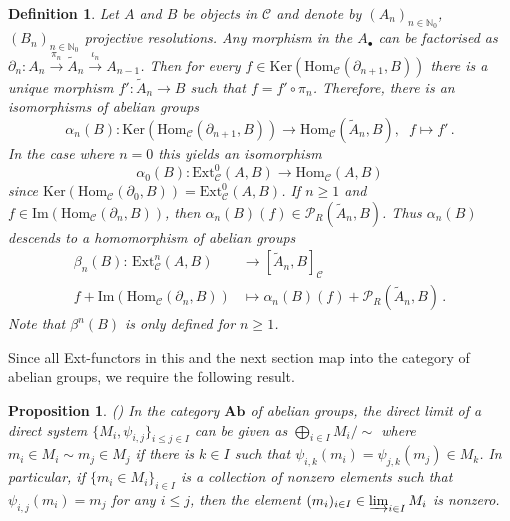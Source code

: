 \documentclass[12pt,a4paper]{article}
\numberwithin{equation}{section}
\newtheorem{prop}[thm]{Proposition}
\newtheorem{defn}[thm]{Definition}
\theoremstyle{nonumberplain}
\begin{document}
\begin{defn}\label{defn:betaprelim}
Let $A$ and $B$ be objects in $\mathcal{C}$ and denote by $(A_n)_{n \in \mathbb{N}_0}$, $(B_n)_{n \in \mathbb{N}_0}$ projective resolutions. Any morphism in the $A_{\bullet}$ can be factorised as $\partial_n: A_n \xrightarrow{\pi_n} \widetilde{A}_n \xrightarrow{\iota_n} A_{n-1}$. Then for every $f \in \mathrm{Ker}(\mathrm{Hom}_{\mathcal{C}}(\partial_{n+1}, B))$ there is a unique morphism $f': \widetilde{A}_n \rightarrow B$ such that $f = f' \circ \pi_n$. Therefore, there is an isomorphisms of abelian groups
\[ \alpha_n(B): \mathrm{Ker}(\mathrm{Hom}_{\mathcal{C}}(\partial_{n+1}, B)) \rightarrow \mathrm{Hom}_{\mathcal{C}}(\widetilde{A}_n, B),\; \; f \mapsto f' \, . \]
In the case where $n = 0$ this yields an isomorphism
\[ \alpha_0(B): \mathrm{Ext}_{\mathcal{C}}^0(A, B) \rightarrow \mathrm{Hom}_{\mathcal{C}}(A, B) \]
since $\mathrm{Ker}(\mathrm{Hom}_{\mathcal{C}}(\partial_0, B)) = \mathrm{Ext}_{\mathcal{C}}^0(A, B)$. If $n \geq 1$ and $f \in \mathrm{Im}(\mathrm{Hom}_{\mathcal{C}}(\partial_n, B))$, then $\alpha_n(B)(f) \in \mathcal{P}_R(\widetilde{A}_n, B)$. Thus $\alpha_n(B)$ descends to a homomorphism of abelian groups
\begin{align*}
\beta_n(B)\! : \, \mathrm{Ext}_{\mathcal{C}}^n(A, B) &\rightarrow [\widetilde{A}_n, B]_{\mathcal{C}} \\
f + \mathrm{Im}(\mathrm{Hom}_{\mathcal{C}}(\partial_n, B)) &\mapsto \alpha_n(B)(f)+ \mathcal{P}_R(\widetilde{A}_n, B) \, .    
\end{align*}
Note that $\beta^n(B)$ is only defined for $n \geq 1$.
\end{defn}

Since all Ext-functors in this and the next section map into the category of abelian groups, we require the following result.

\begin{prop}\label{prop:liminab}
(\cite[p.~261]{osb00}) In the category $\mathbf{Ab}$ of abelian groups, the direct limit of a direct system $\lbrace M_i, \psi_{i, j} \rbrace_{i \leq j \in I}$ can be given as $\bigoplus_{i \in I} M_i/\sim$ where $m_i \in M_i \sim m_j \in M_j$ if there is $k \in I$ such that $\psi_{i, k}(m_i) = \psi_{j, k}(m_j) \in M_k$. In particular, if $\lbrace m_i \in M_i \rbrace_{i \in I}$ is a collection of nonzero elements such that $\psi_{i, j}(m_i) = m_j$ for any $i \leq j$, then the element $(m_i)_{i \in I} \in \varinjlim_{i \in I} M_i$ is nonzero.
\end{prop}
\end{document}
